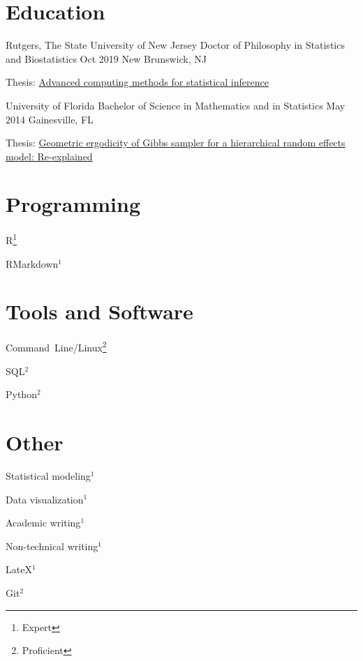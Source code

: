 \documentclass[letterpaper]{resume_config}
\begin{document}

\section{Education}

\EducationExperience
    {Rutgers, The State University of New Jersey} %
    {Doctor of Philosophy in Statistics and Biostatistics} %
    {Oct 2019} %
    {New Brunswick, NJ} %
    {\item Thesis: \href{    https://rucore.libraries.rutgers.edu/rutgers-lib/61966/}{Advanced computing methods for statistical inference} 
    }

\EducationExperience
    {University of Florida} %
    {Bachelor of Science in Mathematics and in Statistics} %
    {May 2014} %
    {Gainesville, FL} %
    {\item Thesis: \href{https://ufdc.ufl.edu/AA00057032/00001}{Geometric ergodicity of Gibbs sampler for a hierarchical random effects model: Re-explained}}


\section{Programming}
\begin{SkillsList}
    \item R\footnote{Expert} 
    \item RMarkdown$^1$
\end{SkillsList}

\section{Tools and Software}
\begin{SkillsList}
    \item Command~Line/Linux\footnote{Proficient} 
    \item SQL$^2$ 
    \item Python$^2$
\end{SkillsList}

\section{Other}
\begin{SkillsList}
    \item Statistical modeling$^1$
    \item Data visualization$^1$ 
    \item Academic writing$^1$
    \item Non-technical writing$^1$
    \item LateX$^1$ 
    \item Git$^2$
\end{SkillsList}
\end{document}
